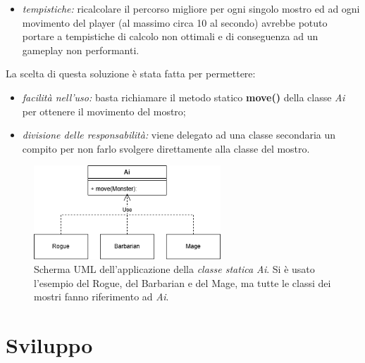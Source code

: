 \documentclass{report}
\begin{document}
\begin{itemize}
    \item \textit{tempistiche:} ricalcolare il percorso migliore per ogni singolo mostro ed ad ogni movimento del player (al massimo circa 10 al secondo) avrebbe potuto portare a tempistiche di calcolo
%
non ottimali e di conseguenza ad un gameplay non performanti.
\end{itemize}

%
La scelta di questa soluzione è stata fatta per permettere:

\begin{itemize}
    \item \textit{facilità nell'uso:} basta richiamare il metodo statico \textbf{move()} della classe \textit{Ai} per ottenere il movimento del mostro;
    \item \textit{divisione delle responsabilità:} viene delegato ad una classe secondaria un compito per non farlo svolgere direttamente alla classe del mostro.
\end{itemize}

\begin{figure}[H]
    \centering
    \includegraphics[width=7cm]{MonsterMovement.png}
    \caption{Scherma UML dell'applicazione della \textit{classe statica Ai}. Si è usato l'esempio del Rogue, del Barbarian e del Mage, ma tutte le classi dei mostri fanno riferimento ad \textit{Ai}.}
\end{figure}

\chapter{Sviluppo}
\end{document}
